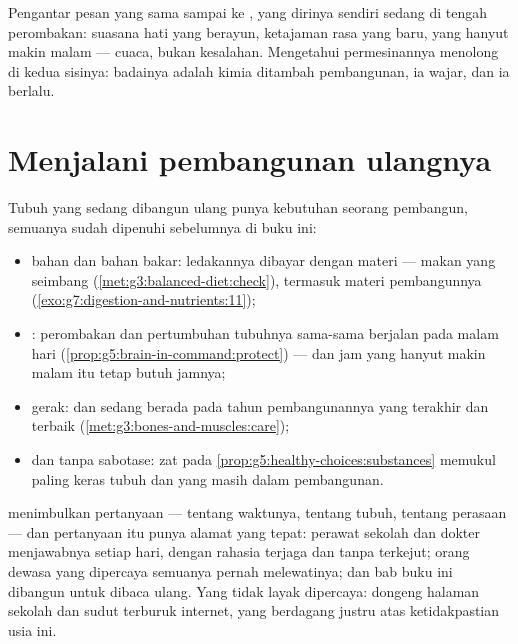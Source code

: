 \begin{remark}\label{rem:g8:puberty:moods}
Pengantar pesan yang sama sampai ke , yang dirinya
sendiri sedang di tengah perombakan: suasana hati yang
berayun, ketajaman rasa yang baru,  yang hanyut makin
malam --- cuaca, bukan kesalahan. Mengetahui permesinannya
menolong di kedua sisinya: badainya adalah kimia ditambah
pembangunan, ia wajar, dan ia berlalu.
\end{remark}

\section{Menjalani pembangunan ulangnya}

\begin{proposition}\label{prop:g8:puberty:care}
Tubuh yang sedang dibangun ulang punya kebutuhan seorang
pembangun, semuanya sudah dipenuhi sebelumnya di buku ini:
\begin{itemize}
  \item bahan dan bahan bakar: ledakannya dibayar dengan
        materi --- makan yang seimbang
        (\cref{met:g3:balanced-diet:check}), termasuk materi
        pembangunnya
        (\cref{exo:g7:digestion-and-nutrients:11});
  \item {}: perombakan  dan pertumbuhan tubuhnya
        sama-sama berjalan pada malam hari
        (\cref{prop:g5:brain-in-command:protect}) --- dan
        jam yang hanyut makin malam itu tetap butuh jamnya;
  \item gerak:  dan  sedang berada pada
        tahun pembangunannya yang terakhir dan terbaik
        (\cref{met:g3:bones-and-muscles:care});
  \item dan tanpa sabotase: zat pada
        \cref{prop:g5:healthy-choices:substances} memukul
        paling keras tubuh dan  yang masih dalam
        pembangunan.
\end{itemize}
\end{proposition}
\admitted

\begin{example}\label{ex:g8:puberty:questions}
 menimbulkan pertanyaan --- tentang waktunya,
tentang tubuh, tentang perasaan --- dan pertanyaan itu punya
alamat yang tepat: perawat sekolah dan dokter menjawabnya
setiap hari, dengan rahasia terjaga dan tanpa terkejut;
orang dewasa yang dipercaya semuanya pernah melewatinya; dan
bab buku ini dibangun untuk dibaca ulang. Yang tidak layak
dipercaya: dongeng halaman sekolah dan sudut terburuk
internet, yang berdagang justru atas ketidakpastian usia ini.
\end{example}

